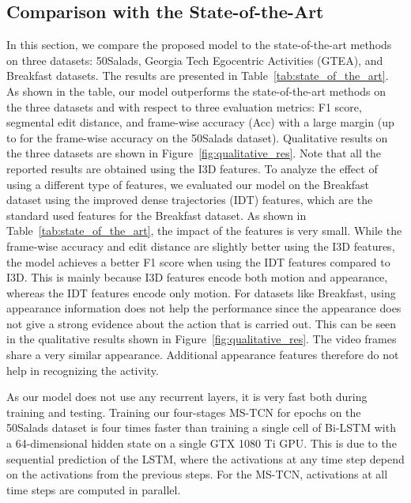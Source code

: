 \documentclass[10pt,twocolumn,letterpaper]{article}
\begin{document}
\subsection{Comparison with the State-of-the-Art}
In this section, we compare the proposed model to the state-of-the-art 
methods on three datasets: 50Salads, Georgia Tech Egocentric Activities (GTEA), 
and Breakfast datasets. The results are presented in Table~\ref{tab:state_of_the_art}. 
As shown in the table, our model outperforms the state-of-the-art methods on the three 
datasets and with respect to three evaluation metrics: F1 score, segmental edit distance, 
and frame-wise accuracy (Acc) with a large margin (up to  for the frame-wise accuracy 
on the 50Salads dataset). Qualitative results on the three datasets are shown in 
Figure~\ref{fig:qualitative_res}. Note that all the reported results are obtained using the 
I3D features. To analyze the effect of using a different type of features, we evaluated our 
model on the Breakfast dataset using the improved dense trajectories (IDT) features, which are 
the standard used features for the Breakfast dataset. As shown in Table~\ref{tab:state_of_the_art}, 
the impact of the features is very small. While the frame-wise accuracy and edit distance are 
slightly better using the I3D features, the model achieves a better F1 score when using the IDT 
features compared to I3D. This is mainly because I3D features encode both motion and appearance, 
whereas the IDT features encode only motion. For datasets like Breakfast, using appearance 
information does not help the performance since the appearance does not give a strong evidence 
about the action that is carried out. This can be seen in the qualitative results shown in 
Figure~\ref{fig:qualitative_res}. The video frames share a very similar appearance. Additional 
appearance features therefore do not help in recognizing the activity.

As our model does not use any recurrent layers, it is very fast both during training and testing. 
Training our four-stages MS-TCN for  epochs on the 50Salads dataset is four times faster than 
training a single cell of Bi-LSTM with a 64-dimensional hidden state on a single GTX 1080 Ti GPU. 
This is due to the sequential prediction of the LSTM, where the activations at any time step 
depend on the activations from the previous steps. For the MS-TCN, activations at all time steps 
are computed in parallel.
\end{document}
